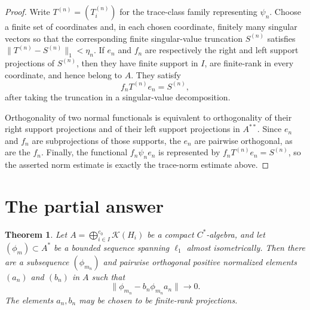 \documentclass[11pt]{article}
\newtheorem{theorem}{Theorem}
\newcommand{\K}{\mathcal K}
\begin{document}
\begin{proof}
Write $T^{(n)}=(T_i^{(n)})$ for the trace-class family representing
$\psi_n$.  Choose a finite set of coordinates and, in each chosen
coordinate, finitely many singular vectors so that the corresponding finite
singular-value truncation $S^{(n)}$ satisfies
$\|T^{(n)}-S^{(n)}\|_1<\eta_n$.  If $e_n$ and $f_n$ are respectively the
right and left support projections of $S^{(n)}$, then they have finite
support in $I$, are finite-rank in every coordinate, and hence belong to
$A$.  They satisfy
\[
 f_nT^{(n)}e_n=S^{(n)},
 \]
after taking the truncation in a singular-value decomposition.

Orthogonality of two normal functionals is equivalent to orthogonality of
their right support projections and of their left support projections in
$A^{**}$.  Since $e_n$ and $f_n$ are subprojections of those supports, the
$e_n$ are pairwise orthogonal, as are the $f_n$.  Finally, the functional
$f_n\psi_ne_n$ is represented by $f_nT^{(n)}e_n=S^{(n)}$, so the asserted
norm estimate is exactly the trace-norm estimate above.
\end{proof}

\section{The partial answer}

\begin{theorem}\label{thm:main}
Let $A=\bigoplus_{i\in I}^{c_0}\K(H_i)$ be a compact $C^*$-algebra, and let
$(\phi_m)\subset A^*$ be a bounded sequence spanning $\ell_1$ almost
isometrically.  Then there are a subsequence $(\phi_{m_n})$ and pairwise
orthogonal positive normalized elements $(a_n)$ and $(b_n)$ in $A$ such
that
\[
 \|\phi_{m_n}-b_n\phi_{m_n}a_n\|\longrightarrow0.
\]
The elements $a_n,b_n$ may be chosen to be finite-rank projections.
\end{theorem}
\end{document}
